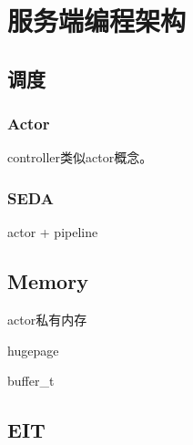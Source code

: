 \chapter{服务端编程架构}

\section{调度}

\subsection{Actor}

controller类似actor概念。

\subsection{SEDA}

actor + pipeline

\section{Memory}

\begin{enumbox}
\item actor私有内存
\item hugepage
\item buffer\_t
\end{enumbox}

\section{EIT}
